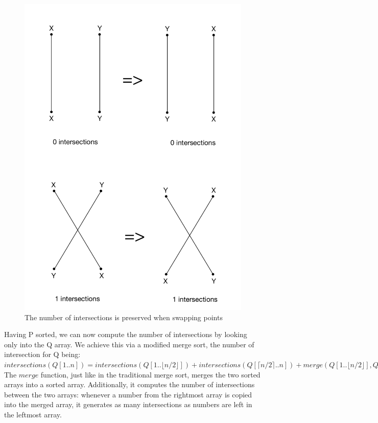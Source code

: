 \begin{figure}[H]
    \centering
    \includegraphics[scale=0.4]{1b-intersections}
    \caption{The number of intersections is preserved when swapping points}
    \label{fig:pointSwap}
\end{figure}

Having P sorted, we can now compute the number of intersections by looking only into the Q array. We achieve this via a modified merge sort, the number of intersection for Q being: \\

$intersections(Q[1..n]) = intersections(Q[1 .. \lfloor n/2 \rfloor]) + intersections(Q[\lceil n/2 \rceil .. n]) + merge(Q[1 .. \lfloor n/2 \rfloor], Q[\lceil n/2 \rceil .. n])$ \\

The $merge$ function, just like in the traditional merge sort, merges the two sorted arrays into a sorted array. 
Additionally, it computes the number of intersections between the two arrays: whenever a number from the rightmost array is copied into the merged array, it generates as many intersections as numbers are left in the leftmost array.

